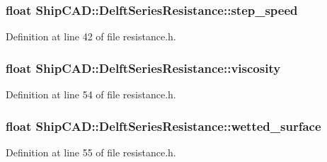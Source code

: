 \subsubsection[{\texorpdfstring{step\+\_\+speed}{step_speed}}]{\setlength{\rightskip}{0pt plus 5cm}float Ship\+C\+A\+D\+::\+Delft\+Series\+Resistance\+::step\+\_\+speed}\hypertarget{structShipCAD_1_1DelftSeriesResistance_a0e3ee6d984afd4ddf1cf483261904574}{}\label{structShipCAD_1_1DelftSeriesResistance_a0e3ee6d984afd4ddf1cf483261904574}


Definition at line 42 of file resistance.\+h.

\subsubsection[{\texorpdfstring{viscosity}{viscosity}}]{\setlength{\rightskip}{0pt plus 5cm}float Ship\+C\+A\+D\+::\+Delft\+Series\+Resistance\+::viscosity}\hypertarget{structShipCAD_1_1DelftSeriesResistance_a08ff900d51b56d7e1726cb4b5a6ffa9b}{}\label{structShipCAD_1_1DelftSeriesResistance_a08ff900d51b56d7e1726cb4b5a6ffa9b}


Definition at line 54 of file resistance.\+h.

\subsubsection[{\texorpdfstring{wetted\+\_\+surface}{wetted_surface}}]{\setlength{\rightskip}{0pt plus 5cm}float Ship\+C\+A\+D\+::\+Delft\+Series\+Resistance\+::wetted\+\_\+surface}\hypertarget{structShipCAD_1_1DelftSeriesResistance_a7ee0a7e2d05634beb7fb9951d80c7557}{}\label{structShipCAD_1_1DelftSeriesResistance_a7ee0a7e2d05634beb7fb9951d80c7557}


Definition at line 55 of file resistance.\+h.

